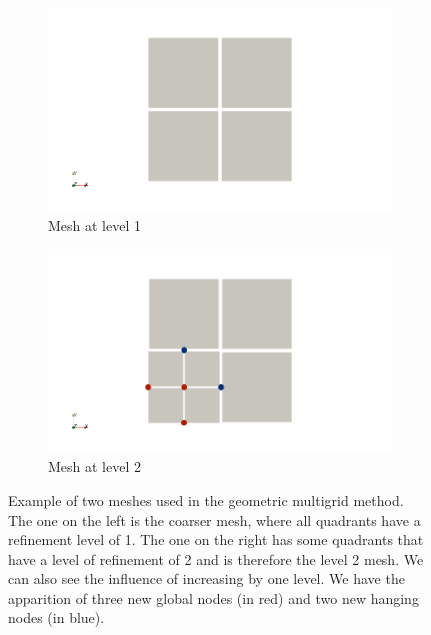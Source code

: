 \begin{figure}
\centering
\begin{subfigure}{.5\textwidth}
  \centering
  \includegraphics[width=1.2\linewidth]{Theory/hang_lev_1.png}
  \caption{Mesh at level 1}
  \label{hang_lev_1}
\end{subfigure}%
\begin{subfigure}{.5\textwidth}
  \centering
  \includegraphics[width=1.2\linewidth]{Theory/hang_lev_2.png}
  \caption{Mesh at level 2}
  \label{hang_lev_2}
\end{subfigure}
\caption{Example of two meshes used in the geometric multigrid method. The one on the left is the coarser mesh, where all quadrants have a refinement level of 1. The one on the right has some quadrants that have a level of refinement of 2 and is therefore the level 2 mesh. We can also see the influence of increasing by one level. We have the apparition of three new global nodes (in red) and two new hanging nodes (in blue).}
\label{hang_lev}
\end{figure}

